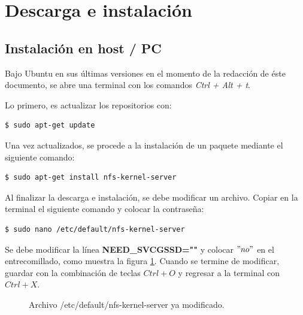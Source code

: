 \section{Descarga e instalación}\label{sec:_install} %

\subsection{Instalación en host / PC}
Bajo Ubuntu en sus últimas versiones en el momento de la redacción de éste documento, se abre una terminal con los comandos \textit{Ctrl + Alt + t}.

Lo primero, es actualizar los repositorios con:
\begin{lstlisting}[language=bash]
$ sudo apt-get update
\end{lstlisting}

Una vez actualizados, se procede a la instalación de un paquete mediante el siguiente comando:

\begin{lstlisting}[language=bash]
$ sudo apt-get install nfs-kernel-server 
\end{lstlisting}

Al finalizar la descarga e instalación, se debe modificar un archivo. Copiar en la terminal el siguiente comando y colocar la contraseña:
\begin{lstlisting}[language=bash]
$ sudo nano /etc/default/nfs-kernel-server
\end{lstlisting}

Se debe modificar la línea \textbf{NEED\_SVCGSSD=""} y colocar $"no"$ en el entrecomillado, como muestra la figura \ref{fig:NFSKer}. Cuando se termine de modificar, guardar con la combinación de teclas $Ctrl + O$ y regresar a la terminal con $Ctrl + X$.

\begin{figure}[H] %
\caption{Archivo /etc/default/nfs-kernel-server ya modificado.}
\label{fig:NFSKer}
\end{figure}

